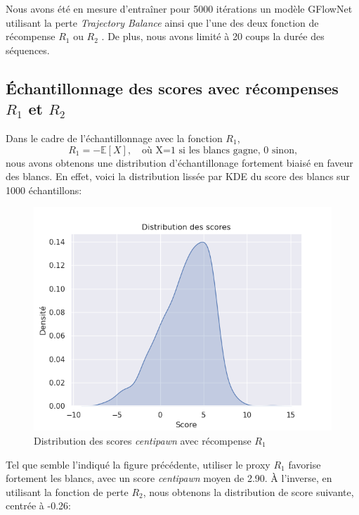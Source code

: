 \documentclass[11pt]{article}
\begin{document}
Nous avons été en mesure d'entraîner pour 5000 itérations un modèle
GFlowNet utilisant la perte \textit{Trajectory Balance} ainsi que
l'une des deux fonction de récompense $R_{1}$ ou $R_{2}$ . De plus,
nous avons limité à 20 coups la durée des séquences.
\subsection*{Échantillonnage des scores avec récompenses $R_{1}$ et $R_{2}$}
Dans le cadre de l'échantillonnage avec la fonction $R_{1}$,
\begin{equation*}
  R_{1} = - \mathbb{E}[X], \quad \text{où X=1 si les blancs gagne, 0
    sinon,}
\end{equation*}
nous avons obtenons une distribution d'échantillonage fortement biaisé
en faveur des blancs. En effet, voici la distribution lissée par KDE
du score des blancs sur 1000 échantillons:

\begin{figure}[H]
  \centering \includegraphics[scale=0.5]{kdeblancs.png}
  \caption{Distribution des scores \textit{centipawn} avec récompense $R_{1}$}
	\label{kdeblancs}
\end{figure}
Tel que semble l'indiqué la figure précédente, utiliser le proxy
$R_{1}$ favorise fortement les blancs, avec un score
\textit{centipawn} moyen de 2.90.
À l'inverse, en utilisant la fonction de perte $R_{2}$, nous obtenons
la distribution de score suivante, centrée à -0.26:
\end{document}

